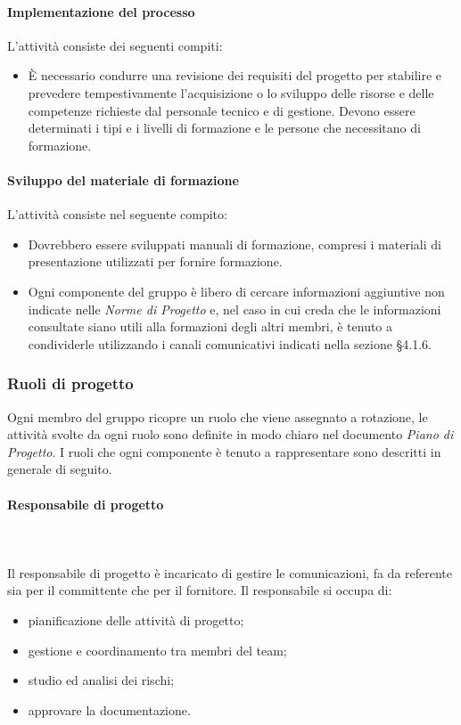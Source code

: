 		\paragraph{Implementazione del processo}
		L'attività consiste dei seguenti compiti:
		\begin{itemize}
			\item È necessario condurre una revisione dei requisiti del progetto per stabilire e prevedere tempestivamente l'acquisizione o lo sviluppo delle risorse e delle competenze richieste dal personale tecnico e di gestione. Devono essere determinati i tipi e i livelli di formazione e le persone che necessitano di formazione. 
		\end{itemize}
		\paragraph{Sviluppo del materiale di formazione}
		L'attività consiste nel seguente compito:
		\begin{itemize}
			\item Dovrebbero essere sviluppati manuali di formazione, compresi i materiali di presentazione utilizzati per fornire formazione.
			\item Ogni componente del gruppo è libero di cercare informazioni aggiuntive non indicate nelle \textit{Norme di Progetto} e, nel caso in cui creda che le informazioni consultate siano utili  alla formazioni degli altri membri, è tenuto a condividerle utilizzando i canali comunicativi indicati nella sezione §4.1.6.
		\end{itemize}
		
		
		
		\subsubsection{Ruoli di progetto}%
		Ogni membro del gruppo ricopre un ruolo che viene assegnato a rotazione, le attività svolte da ogni ruolo sono definite in modo chiaro nel documento \textit{Piano di Progetto}.
		I ruoli che ogni componente è tenuto a rappresentare sono descritti in generale di seguito.
			\paragraph{Responsabile di progetto} \mbox{}\\ \mbox{}\\
			Il responsabile di progetto è incaricato di gestire le comunicazioni, fa da referente sia per il committente che per il fornitore.\newline
			Il responsabile si occupa di:
			\begin{itemize}
				\item pianificazione delle attività di progetto;
				\item  gestione e coordinamento tra membri del team;
				\item studio ed analisi dei rischi;
				\item approvare la documentazione.
			\end{itemize}
